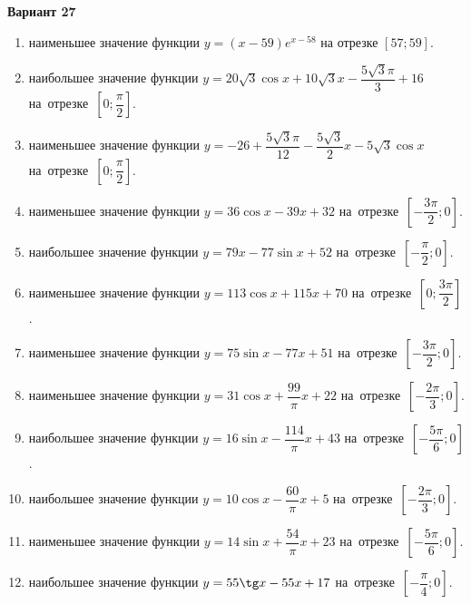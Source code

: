 \documentclass[a4paper,10pt]{article}
\begin{document}
\begin{center}\Large\textbf{Вариант 27}\end{center}

\begin{enumerate}
\item {} наименьшее значение функции $y = \left(x-59\right)e^{x-58}$ на отрезке $\left[57;59\right]$.

\item {} наибольшее значение функции $y = 20\sqrt{3}\cos x+10\sqrt{3}x-\dfrac{5\sqrt{3}\pi}{3} +16$ на~отрезке~$\left[0;\dfrac{\pi }{2}\right]$.

\item {} наименьшее значение функции $y = -26+\dfrac{5\sqrt{3} \pi}{12}-\dfrac{5\sqrt{3}}{2}x-5\sqrt{3}\cos x$ на~отрезке~$\left[0;\dfrac{\pi }{2}\right]$.

\item {} наименьшее значение функции $y = 36\cos x-39x+32$ на~отрезке~$\left[-\dfrac{3\pi }{2};0\right]$.

\item {} наибольшее значение функции $y = 79x-77\sin x+52$ на~отрезке~$\left[-\dfrac{\pi }{2};0\right]$.

\item {} наименьшее значение функции $y = 113\cos x+115x+70$ на~отрезке~$\left[0;\dfrac{3\pi }{2}\right]$.

\item {} наименьшее значение функции $y = 75\sin x-77x+51$ на~отрезке~$\left[-\dfrac{3\pi }{2};0\right]$.

\item {} наименьшее значение функции $y = 31\cos x+\dfrac{99}{\pi }x +22$ на~отрезке~$\left[-\dfrac{2\pi }{3};0\right]$.

\item {} наибольшее значение функции $y = 16\sin x-\dfrac{114}{\pi }x+43$ на~отрезке~$\left[-\dfrac{5\pi }{6};0\right]$.

\item {} наибольшее значение функции $y = 10\cos x-\dfrac{60}{\pi }x+5$ на~отрезке~$\left[-\dfrac{2\pi }{3};0\right]$.

\item {} наименьшее значение функции $y = 14\sin x+\dfrac{54}{\pi }x+23$ на~отрезке~$\left[-\dfrac{5\pi }{6};0\right]$.

\item {} наибольшее значение функции $y = 55\tg x-55x+17$ на~отрезке~$\left[-\dfrac{\pi }{4};0\right]$.


\end{enumerate}
\end{document}
